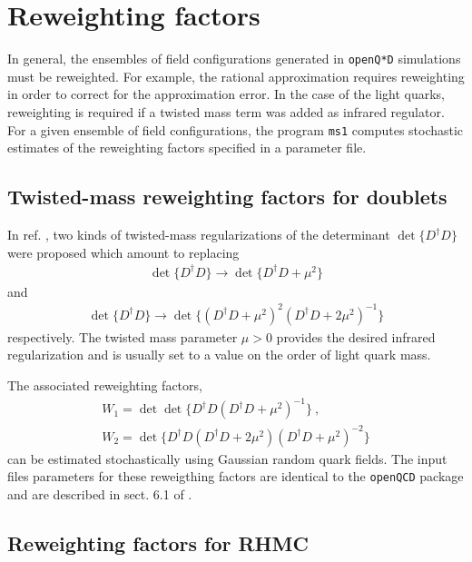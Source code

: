 \documentclass[11pt,fleqn]{article}
\begin{document}
\section{Reweighting factors}
\label{sec:rw}

In general, the ensembles of field configurations generated in \texttt{openQ*D}
simulations must be reweighted. For example, the rational approximation requires
reweighting in order to correct for the approximation error. In the case of the
light quarks, reweighting is required if a twisted mass term was added as
infrared regulator. For a given ensemble of field configurations, the program
\texttt{ms1} computes stochastic estimates of the reweighting factors specified
in a parameter file.


\subsection{Twisted-mass reweighting factors for doublets}

In ref. \cite{Luscher:2008tw}, two kinds of twisted-mass regularizations of the
determinant $\det \{ D^\dag D \}$ were proposed which amount to replacing
%
\begin{gather}
   \det \{ D^\dag D \} \rightarrow \det \{ D^\dag D + \mu^2 \}
\end{gather}
and
\begin{gather}
   \det \{ D^\dag D \} \rightarrow \det \{ (D^\dag D + \mu^2)^2 (D^\dag D + 2\mu^2)^{-1} \}
\end{gather}
%
respectively. The twisted mass parameter $\mu > 0$ provides the desired infrared
regularization and is usually set to a value on the order of light quark mass.

The associated reweighting factors,
%
\begin{gather}
   W_1 = \det \det \{ D^\dag D  (D^\dag D + \mu^2)^{-1} \} \ , \\
   W_2 = \det \{ D^\dag D (D^\dag D + 2\mu^2) (D^\dag D + \mu^2)^{-2} \}
\end{gather}
%
can be estimated stochastically using Gaussian random quark fields. The input
files parameters for these reweigthing factors are identical to the
\texttt{openQCD} package and are described in sect. 6.1 of \cite{openQCD:parms}.



\subsection{Reweighting factors for RHMC}
\end{document}
